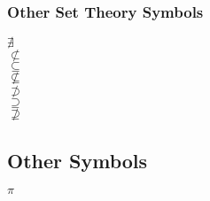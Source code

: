 \documentclass[letterpaper]{article}
\begin{document}
\begin{multicols*}{2}
\subsubsection*{Other Set Theory Symbols}
$\nexists$\\
$\not\subset$\\
$\subseteq$\\
$\nsubseteq$\\
$\not\supset$\\
$\supseteq$\\
$\nsupseteq$\\

\subsection*{Other Symbols}
$\pi$\\
\end{multicols*}
\end{document}
